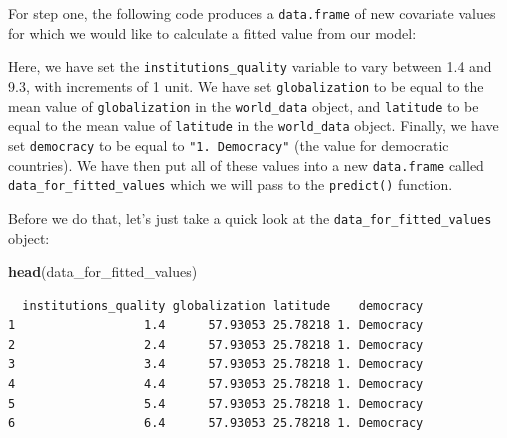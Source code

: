 \documentclass[]{article}
\newenvironment{Shaded}{\begin{snugshade}}{\end{snugshade}}
\newcommand{\KeywordTok}[1]{\textcolor[rgb]{0.13,0.29,0.53}{\textbf{#1}}}
\newcommand{\DataTypeTok}[1]{\textcolor[rgb]{0.13,0.29,0.53}{#1}}
\newcommand{\DecValTok}[1]{\textcolor[rgb]{0.00,0.00,0.81}{#1}}
\newcommand{\FloatTok}[1]{\textcolor[rgb]{0.00,0.00,0.81}{#1}}
\newcommand{\StringTok}[1]{\textcolor[rgb]{0.31,0.60,0.02}{#1}}
\newcommand{\OperatorTok}[1]{\textcolor[rgb]{0.81,0.36,0.00}{\textbf{#1}}}
\newcommand{\NormalTok}[1]{#1}
\theoremstyle{definition}
\theoremstyle{definition}
\theoremstyle{definition}
\theoremstyle{remark}
\begin{document}
For step one, the following code produces a \texttt{data.frame} of new
covariate values for which we would like to calculate a fitted value
from our model:

\begin{Shaded}
\end{Shaded}

Here, we have set the \texttt{institutions\_quality} variable to vary
between 1.4 and 9.3, with increments of 1 unit. We have set
\texttt{globalization} to be equal to the mean value of
\texttt{globalization} in the \texttt{world\_data} object, and
\texttt{latitude} to be equal to the mean value of \texttt{latitude} in
the \texttt{world\_data} object. Finally, we have set \texttt{democracy}
to be equal to \texttt{"1.\ Democracy"} (the value for democratic
countries). We have then put all of these values into a new
\texttt{data.frame} called \texttt{data\_for\_fitted\_values} which we
will pass to the \texttt{predict()} function.

Before we do that, let's just take a quick look at the
\texttt{data\_for\_fitted\_values} object:

\begin{Shaded}
\begin{Highlighting}[]
\KeywordTok{head}\NormalTok{(data_for_fitted_values)}
\end{Highlighting}
\end{Shaded}

\begin{verbatim}
  institutions_quality globalization latitude    democracy
1                  1.4      57.93053 25.78218 1. Democracy
2                  2.4      57.93053 25.78218 1. Democracy
3                  3.4      57.93053 25.78218 1. Democracy
4                  4.4      57.93053 25.78218 1. Democracy
5                  5.4      57.93053 25.78218 1. Democracy
6                  6.4      57.93053 25.78218 1. Democracy
\end{verbatim}
\end{document}

